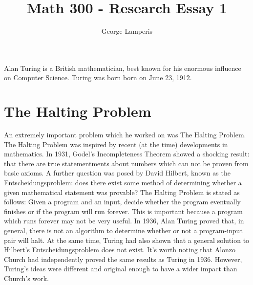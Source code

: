 \documentclass[12pt]{article}
\title{Math 300 - Research Essay 1}
\author{George Lamperis}
\date{}
\theoremstyle{mystyle}
\begin{document}
\maketitle

Alan Turing is a British mathematician, best known for his enormous influence on
Computer Science. Turing was born born on June 23, 1912.

\section{The Halting Problem}

An extremely important problem which he worked on was The Halting Problem. 
The Halting Problem was inspired by recent (at the time) developments in
mathematics. In 1931, Godel's Incompleteness Theorem showed a shocking result:
that there are true statementments about numbers which can not be proven from
basic axioms. A further question was posed by David Hilbert, known as the
Entscheidungsproblem: does there exist some method of determining whether a 
given mathematical statement was provable?
The Halting Problem is stated as follows: Given a program and an input, decide
whether the program eventually finishes or if the program will run forever. This
is important because a program which runs forever may not be very useful. In
1936, Alan Turing proved that, in general, there is not an algorithm to
determine whether or not a program-input pair will halt. At the same time,
Turing had also shown that a general solution to Hilbert's Entscheidungsproblem
does not exist. It's worth noting that Alonzo Church had independently proved
the same results as Turing in 1936. However, Turing's ideas were different and
original enough to have a wider impact than Church's work.
\end{document}
